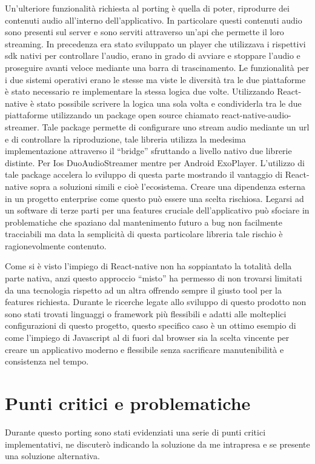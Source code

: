Un'ulteriore funzionalità richiesta al porting è quella di poter, riprodurre dei contenuti audio all’interno dell’applicativo. In particolare questi contenuti audio sono presenti sul server e sono serviti attraverso un'api che permette il loro streaming. In precedenza era stato sviluppato un player che utilizzava i rispettivi sdk nativi per controllare l’audio, erano in grado di avviare e stoppare l’audio e proseguire avanti veloce mediante una barra di trascinamento. Le funzionalità per i due sistemi operativi erano le stesse ma viste le diversità tra le due piattaforme è stato necessario re implementare la stessa logica due volte. Utilizzando React-native è stato possibile scrivere la logica una sola volta e condividerla tra le due piattaforme utilizzando un package open source chiamato react-native-audio-streamer. Tale package permette di configurare uno stream audio mediante un url e di controllare la riproduzione, tale libreria utilizza la medesima implementazione attraverso il “bridge” sfruttando a livello nativo due librerie distinte. Per Ios DuoAudioStreamer mentre per Android ExoPlayer. L’utilizzo di tale package accelera lo sviluppo di questa parte mostrando il vantaggio di React-native sopra a soluzioni simili e cioè l’ecosistema. Creare una dipendenza esterna in un progetto enterprise come questo può essere una scelta rischiosa. Legarsi ad un software di terze parti per una features cruciale dell’applicativo può sfociare in problematiche che spaziano dal mantenimento futuro a bug non facilmente tracciabili ma data la semplicità di questa particolare libreria tale rischio è ragionevolmente contenuto.\vspace{5mm}

Come si è visto l’impiego di React-native non ha soppiantato la totalità della parte nativa, anzi questo approccio “misto” ha permesso di non trovarsi limitati da una tecnologia rispetto ad un altra offrendo sempre il giusto tool per la features richiesta. Durante le ricerche legate allo sviluppo di questo prodotto non sono stati trovati linguaggi o framework più flessibili e adatti alle molteplici configurazioni di questo progetto, questo specifico caso è un ottimo esempio di come l’impiego di Javascript al di fuori dal browser sia la scelta vincente per creare un applicativo moderno e flessibile senza sacrificare manutenibilità e consistenza nel tempo.\vspace{5mm}

\section{Punti critici e problematiche}
\vspace{5mm}Durante questo porting sono stati evidenziati una serie di punti critici implementativi, ne discuterò indicando la soluzione da me intrapresa e se presente una soluzione alternativa.\vspace{5mm}

